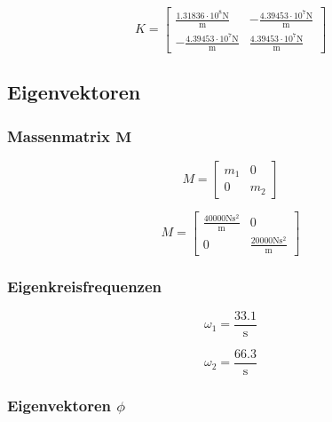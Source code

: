 \documentclass[
  letterpaper,
  DIV=11]{scrreprt}
\begin{document}
\begin{equation}K = \left[\begin{matrix}\frac{1.31836 \cdot 10^{8} \text{N}}{\text{m}} & - \frac{4.39453 \cdot 10^{7} \text{N}}{\text{m}}\\- \frac{4.39453 \cdot 10^{7} \text{N}}{\text{m}} & \frac{4.39453 \cdot 10^{7} \text{N}}{\text{m}}\end{matrix}\right]\end{equation}

\hypertarget{eigenvektoren-4}{%
\subsection{Eigenvektoren}\label{eigenvektoren-4}}

\hypertarget{massenmatrix-mathbfm-3}{%
\subsubsection{\texorpdfstring{Massenmatrix
\(\mathbf{M}\)}{Massenmatrix \textbackslash mathbf\{M\}}}\label{massenmatrix-mathbfm-3}}

\begin{equation}M = \left[\begin{matrix}m_{1} & 0\\0 & m_{2}\end{matrix}\right]\end{equation}

\begin{equation}M = \left[\begin{matrix}\frac{40000 \text{N} \text{s}^{2}}{\text{m}} & 0\\0 & \frac{20000 \text{N} \text{s}^{2}}{\text{m}}\end{matrix}\right]\end{equation}

\hypertarget{eigenkreisfrequenzen-5}{%
\subsubsection{Eigenkreisfrequenzen}\label{eigenkreisfrequenzen-5}}

\begin{equation}\omega_{1} = \frac{33.1}{\text{s}}\end{equation}

\begin{equation}\omega_{2} = \frac{66.3}{\text{s}}\end{equation}

\hypertarget{eigenvektoren-phi-3}{%
\subsubsection{\texorpdfstring{Eigenvektoren
\(\phi\)}{Eigenvektoren \textbackslash phi}}\label{eigenvektoren-phi-3}}
\end{document}
